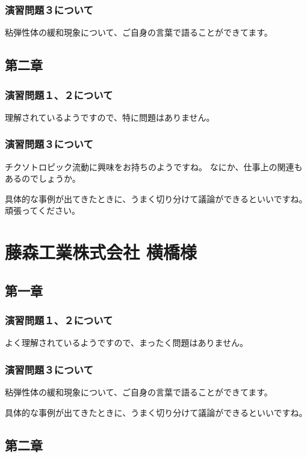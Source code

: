 \documentclass[uplatex,dvipdfmx,a4paper,11pt]{jsreport}
\begin{document}
\subsubsection*{演習問題３について}

粘弾性体の緩和現象について、ご自身の言葉で語ることができてます。

\subsection*{第二章}
\subsubsection*{演習問題１、２について}
理解されているようですので、特に問題はありません。

\subsubsection*{演習問題３について}

チクソトロピック流動に興味をお持ちのようですね。
なにか、仕事上の関連もあるのでしょうか。

具体的な事例が出てきたときに、うまく切り分けて議論ができるといいですね。
頑張ってください。

\clearpage
\section*{藤森工業株式会社 横橋様}
\subsection*{第一章}
\subsubsection*{演習問題１、２について}
よく理解されているようですので、まったく問題はありません。

\subsubsection*{演習問題３について}
粘弾性体の緩和現象について、ご自身の言葉で語ることができてます。

具体的な事例が出てきたときに、うまく切り分けて議論ができるといいですね。

\subsection*{第二章}
\end{document}

